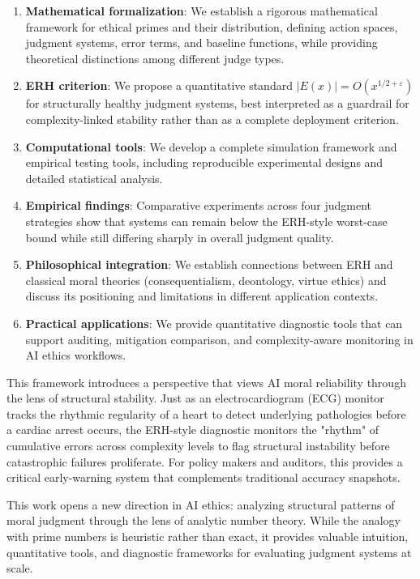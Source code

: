 \documentclass[12pt,a4paper]{article}
\theoremstyle{definition}
\theoremstyle{remark}
\begin{document}
\begin{enumerate}
    \item \textbf{Mathematical formalization}: We establish a rigorous mathematical framework for ethical primes and their distribution, defining action spaces, judgment systems, error terms, and baseline functions, while providing theoretical distinctions among different judge types.
    \item \textbf{ERH criterion}: We propose a quantitative standard $|E(x)| = O(x^{1/2+\varepsilon})$ for structurally healthy judgment systems, best interpreted as a guardrail for complexity-linked stability rather than as a complete deployment criterion.
    \item \textbf{Computational tools}: We develop a complete simulation framework and empirical testing tools, including reproducible experimental designs and detailed statistical analysis.
    \item \textbf{Empirical findings}: Comparative experiments across four judgment strategies show that systems can remain below the ERH-style worst-case bound while still differing sharply in overall judgment quality.
    \item \textbf{Philosophical integration}: We establish connections between ERH and classical moral theories (consequentialism, deontology, virtue ethics) and discuss its positioning and limitations in different application contexts.
    \item \textbf{Practical applications}: We provide quantitative diagnostic tools that can support auditing, mitigation comparison, and complexity-aware monitoring in AI ethics workflows.
\end{enumerate}

This framework introduces a perspective that views AI moral reliability through the lens of structural stability. Just as an electrocardiogram (ECG) monitor tracks the rhythmic regularity of a heart to detect underlying pathologies before a cardiac arrest occurs, the ERH-style diagnostic monitors the "rhythm" of cumulative errors across complexity levels to flag structural instability before catastrophic failures proliferate. For policy makers and auditors, this provides a critical early-warning system that complements traditional accuracy snapshots.

This work opens a new direction in AI ethics: analyzing structural patterns of moral judgment through the lens of analytic number theory. While the analogy with prime numbers is heuristic rather than exact, it provides valuable intuition, quantitative tools, and diagnostic frameworks for evaluating judgment systems at scale.
\end{document}
